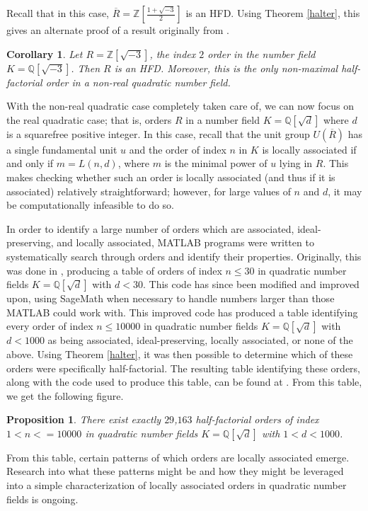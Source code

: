 \documentclass[12pt]{amsart}
\newtheorem{proposition}[theorem]{Proposition}
\newtheorem{corollary}[theorem]{Corollary}
\theoremstyle{definition}
\newcommand{\bZ}{\mathbb Z}
\newcommand{\bQ}{\mathbb Q}
\newcommand{\Rbar}{\overline{R}}
\begin{document}
	Recall that in this case, $\Rbar=\bZ[\frac{1+\sqrt{-3}}{2}]$ is an HFD. Using Theorem \ref{halter}, this gives an alternate proof of a result originally from \cite{coykendallhfd}.
	
	\begin{corollary}
		Let $R=\bZ[\sqrt{-3}]$, the index $2$ order in the number field $K=\bQ[\sqrt{-3}]$. Then $R$ is an HFD. Moreover, this is the only non-maximal half-factorial order in a non-real quadratic number field.
	\end{corollary}
	
	With the non-real quadratic case completely taken care of, we can now focus on the real quadratic case; that is, orders $R$ in a number field $K=\bQ[\sqrt{d}]$ where $d$ is a squarefree positive integer. In this case, recall that the unit group $U(\Rbar)$ has a single fundamental unit $u$ and the order of index $n$ in $K$ is locally associated if and only if $m=L(n,d)$, where $m$ is the minimal power of $u$ lying in $R$. This makes checking whether such an order is locally associated (and thus if it is associated) relatively straightforward; however, for large values of $n$ and $d$, it may be computationally infeasible to do so.
	
	In order to identify a large number of orders which are associated, ideal-preserving, and locally associated, MATLAB programs were written to systematically search through orders and identify their properties. Originally, this was done in \cite{dissertation}, producing a table of orders of index $n\leq 30$ in quadratic number fields $K=\bQ[\sqrt{d}]$ with $d<30$. This code has since been modified and improved upon, using SageMath when necessary to handle numbers larger than those MATLAB could work with. This improved code has produced a table identifying every order of index $n\leq 10000$ in quadratic number fields $K=\bQ[\sqrt{d}]$ with $d<1000$ as being associated, ideal-preserving, locally associated, or none of the above. Using Theorem \ref{halter}, it was then possible to determine which of these orders were specifically half-factorial. The resulting table identifying these orders, along with the code used to produce this table, can be found at \cite{quadla}. From this table, we get the following figure.
	
	\begin{proposition}
		There exist exactly $29$,$163$ half-factorial orders of index $1<n<=10000$ in quadratic number fields $K=\bQ[\sqrt{d}]$ with $1<d<1000$.
	\end{proposition}
	
	From this table, certain patterns of which orders are locally associated emerge. Research into what these patterns might be and how they might be leveraged into a simple characterization of locally associated orders in quadratic number fields is ongoing.
	
	
	
\end{document}
